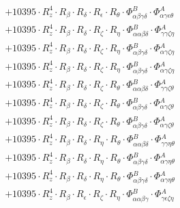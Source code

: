 \documentclass{article}
\begin{document}
\begin{subequations}
\begin{gather}
\begin{array}{c}
 \\[0.2em] 		 + 10395 \cdot R_{z}^{4} \cdot R_{\beta{}} \cdot R_{\delta{}} \cdot R_{\epsilon{}} \cdot R_{\theta{}} \cdot \Phi{}^{B}_{\alpha{}\beta{}\gamma{}\delta{}} \cdot \Phi{}^{A}_{\alpha{}\gamma{}\epsilon{}\theta{}} 
 \\[0.2em] 		 + 10395 \cdot R_{z}^{4} \cdot R_{\beta{}} \cdot R_{\delta{}} \cdot R_{\zeta{}} \cdot R_{\eta{}} \cdot \Phi{}^{B}_{\alpha{}\alpha{}\beta{}\delta{}} \cdot \Phi{}^{A}_{\gamma{}\gamma{}\zeta{}\eta{}} 
 \\[0.2em] 		 + 10395 \cdot R_{z}^{4} \cdot R_{\beta{}} \cdot R_{\delta{}} \cdot R_{\zeta{}} \cdot R_{\eta{}} \cdot \Phi{}^{B}_{\alpha{}\beta{}\gamma{}\delta{}} \cdot \Phi{}^{A}_{\alpha{}\gamma{}\zeta{}\eta{}} 
 \\[0.2em] 		 + 10395 \cdot R_{z}^{4} \cdot R_{\beta{}} \cdot R_{\delta{}} \cdot R_{\zeta{}} \cdot R_{\eta{}} \cdot \Phi{}^{B}_{\alpha{}\beta{}\gamma{}\delta{}} \cdot \Phi{}^{A}_{\alpha{}\gamma{}\zeta{}\eta{}} 
 \\[0.2em] 		 + 10395 \cdot R_{z}^{4} \cdot R_{\beta{}} \cdot R_{\delta{}} \cdot R_{\zeta{}} \cdot R_{\theta{}} \cdot \Phi{}^{B}_{\alpha{}\alpha{}\beta{}\delta{}} \cdot \Phi{}^{A}_{\gamma{}\gamma{}\zeta{}\theta{}} 
 \\[0.2em] 		 + 10395 \cdot R_{z}^{4} \cdot R_{\beta{}} \cdot R_{\delta{}} \cdot R_{\zeta{}} \cdot R_{\theta{}} \cdot \Phi{}^{B}_{\alpha{}\beta{}\gamma{}\delta{}} \cdot \Phi{}^{A}_{\alpha{}\gamma{}\zeta{}\theta{}} 
 \\[0.2em] 		 + 10395 \cdot R_{z}^{4} \cdot R_{\beta{}} \cdot R_{\delta{}} \cdot R_{\zeta{}} \cdot R_{\theta{}} \cdot \Phi{}^{B}_{\alpha{}\beta{}\gamma{}\delta{}} \cdot \Phi{}^{A}_{\alpha{}\gamma{}\zeta{}\theta{}} 
 \\[0.2em] 		 + 10395 \cdot R_{z}^{4} \cdot R_{\beta{}} \cdot R_{\delta{}} \cdot R_{\eta{}} \cdot R_{\theta{}} \cdot \Phi{}^{B}_{\alpha{}\alpha{}\beta{}\delta{}} \cdot \Phi{}^{A}_{\gamma{}\gamma{}\eta{}\theta{}} 
 \\[0.2em] 		 + 10395 \cdot R_{z}^{4} \cdot R_{\beta{}} \cdot R_{\delta{}} \cdot R_{\eta{}} \cdot R_{\theta{}} \cdot \Phi{}^{B}_{\alpha{}\beta{}\gamma{}\delta{}} \cdot \Phi{}^{A}_{\alpha{}\gamma{}\eta{}\theta{}} 
 \\[0.2em] 		 + 10395 \cdot R_{z}^{4} \cdot R_{\beta{}} \cdot R_{\delta{}} \cdot R_{\eta{}} \cdot R_{\theta{}} \cdot \Phi{}^{B}_{\alpha{}\beta{}\gamma{}\delta{}} \cdot \Phi{}^{A}_{\alpha{}\gamma{}\eta{}\theta{}} 
 \\[0.2em] 		 + 10395 \cdot R_{z}^{4} \cdot R_{\beta{}} \cdot R_{\epsilon{}} \cdot R_{\zeta{}} \cdot R_{\eta{}} \cdot \Phi{}^{B}_{\alpha{}\alpha{}\beta{}\gamma{}} \cdot \Phi{}^{A}_{\gamma{}\epsilon{}\zeta{}\eta{}} 

\end{array}
\end{gather}
\end{subequations}
\end{document}
